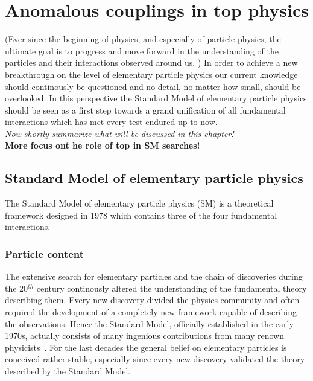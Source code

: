 \chapter{Anomalous couplings in top physics} \label{chp::SM}

(Ever since the beginning of physics, and especially of particle physics, the ultimate goal is to progress and move forward in the understanding of the particles and their interactions observed around us. )
In order to achieve a new breakthrough on the level of elementary particle physics our current knowledge should continously be questioned and no detail, no matter how small, should be overlooked.
In this perspective the Standard Model of elementary particle physics should be seen as a first step towards a grand unification of all fundamental interactions which has met every test endured up to now.
\\
\textit{Now shortly summarize what will be discussed in this chapter!}\\
\textbf{More focus ont he role of top in SM searches!}

\section{Standard Model of elementary particle physics}
The Standard Model of elementary particle physics (SM) is a theoretical framework designed in 1978 which contains three of the four fundamental interactions.

\subsection{Particle content}

The extensive search for elementary particles and the chain of discoveries during the 20$^{th}$ century continously altered the understanding of the fundamental theory describing them.
Every new discovery divided the physics community and often required the development of a completely new framework capable of describing the observations.
Hence the Standard Model, officially established in the early 1970s, actually consists of many ingenious contributions from many renown physicists~\cite{MandlAndShaw, PeskinAndSchroeder, Paschos:2007pi}. 
For the last decades the general belief on elementary particles is conceived rather stable, especially since every new discovery validated the theory described by the Standard Model. %
\\

